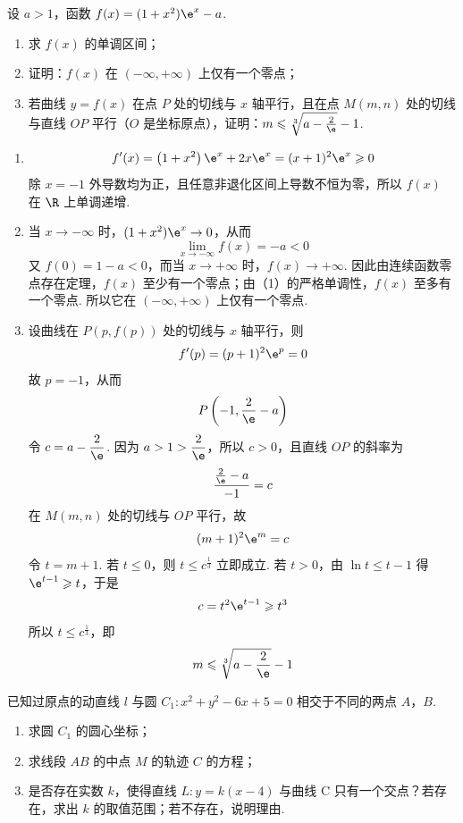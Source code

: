 \begin{problem}
设 \(a > 1\)，函数 \(f(x) = (1 + x^2)\e^x - a\).

\begin{enumerate}
\item 求 \(f(x)\) 的单调区间；
\item 证明：\(f(x)\) 在 \((-\infty, +\infty)\) 上仅有一个零点；
\item 若曲线 \(y = f(x)\) 在点 \(P\) 处的切线与 \(x\) 轴平行，且在点 \(M(m, n)\) 处的切线与直线 \(OP\) 平行（\(O\) 是坐标原点），证明：\(m \leqslant \sqrt[3]{a - \frac{2}{\e}} - 1\).
\end{enumerate}
\end{problem}

\begin{solution}
\begin{enumerate}
\item
\[
f'(x)=\left(1+x^2\right)\e^x+2x\e^x
=(x+1)^2\e^x\geqslant0
\]
除 \(x=-1\) 外导数均为正，且任意非退化区间上导数不恒为零，所以 \(f(x)\) 在 \(\R\) 上单调递增.
\item 当 \(x\to-\infty\) 时，\((1+x^2)\e^x\to0\)，从而
\[
\lim_{x\to-\infty}f(x)=-a<0
\]
又 \(f(0)=1-a<0\)，而当 \(x\to+\infty\) 时，\(f(x)\to+\infty\). 因此由连续函数零点存在定理，\(f(x)\) 至少有一个零点；由（1）的严格单调性，\(f(x)\) 至多有一个零点. 所以它在 \((-\infty,+\infty)\) 上仅有一个零点.
\item 设曲线在 \(P(p,f(p))\) 处的切线与 \(x\) 轴平行，则
\[
f'(p)=(p+1)^2\e^p=0
\]
故 \(p=-1\)，从而
\[
P\left(-1,\frac2\e-a\right)
\]
令 \(c=a-\dfrac2\e\). 因为 \(a>1>\dfrac2\e\)，所以 \(c>0\)，且直线 \(OP\) 的斜率为
\[
\frac{\frac2\e-a}{-1}=c
\]
在 \(M(m,n)\) 处的切线与 \(OP\) 平行，故
\[
(m+1)^2\e^m=c
\]
令 \(t=m+1\). 若 \(t\leqslant0\)，则 \(t\leqslant c^{\frac{1}{3}}\) 立即成立. 若 \(t>0\)，由 \(\ln t\leqslant t-1\) 得 \(\e^{t-1}\geqslant t\)，于是
\[
c=t^2\e^{t-1}\geqslant t^3
\]
所以 \(t\leqslant c^{\frac{1}{3}}\)，即
\[
m\leqslant\sqrt[3]{a-\frac2\e}-1
\]
\end{enumerate}
\end{solution}

\begin{problem}
已知过原点的动直线 \(l\) 与圆 \(C_1: x^2 + y^2 - 6x + 5 = 0\) 相交于不同的两点 \(A\)，\(B\).

\begin{enumerate}
\item 求圆 \(C_1\) 的圆心坐标；
\item 求线段 \(AB\) 的中点 \(M\) 的轨迹 \(C\) 的方程；
\item 是否存在实数 \(k\)，使得直线 \(L: y = k(x - 4)\) 与曲线 C 只有一个交点？若存在，求出 \(k\) 的取值范围；若不存在，说明理由.
\end{enumerate}
\end{problem}

